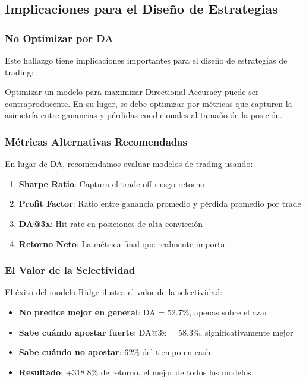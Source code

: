 \subsection{Implicaciones para el Dise\~no de Estrategias}
\label{subsec:strategy_implications}

\subsubsection{No Optimizar por DA}

Este hallazgo tiene implicaciones importantes para el dise\~no de estrategias de trading:

\begin{tcolorbox}[colback=gray!5!white,colframe=gray!75!black,title=Implicaci\'on Clave]
Optimizar un modelo para maximizar Directional Accuracy puede ser contraproducente. En su lugar, se debe optimizar por m\'etricas que capturen la asimetr\'ia entre ganancias y p\'erdidas condicionales al tama\~no de la posici\'on.
\end{tcolorbox}

\subsubsection{M\'etricas Alternativas Recomendadas}

En lugar de DA, recomendamos evaluar modelos de trading usando:

\begin{enumerate}
    \item \textbf{Sharpe Ratio}: Captura el trade-off riesgo-retorno
    \item \textbf{Profit Factor}: Ratio entre ganancia promedio y p\'erdida promedio por trade
    \item \textbf{DA@3x}: Hit rate en posiciones de alta convicci\'on
    \item \textbf{Retorno Neto}: La m\'etrica final que realmente importa
\end{enumerate}

\subsubsection{El Valor de la Selectividad}

El \'exito del modelo Ridge ilustra el valor de la selectividad:

\begin{itemize}
    \item \textbf{No predice mejor en general}: DA = 52.7\%, apenas sobre el azar
    \item \textbf{Sabe cu\'ando apostar fuerte}: DA@3x = 58.3\%, significativamente mejor
    \item \textbf{Sabe cu\'ando no apostar}: 62\% del tiempo en cash
    \item \textbf{Resultado}: +318.8\% de retorno, el mejor de todos los modelos
\end{itemize}


